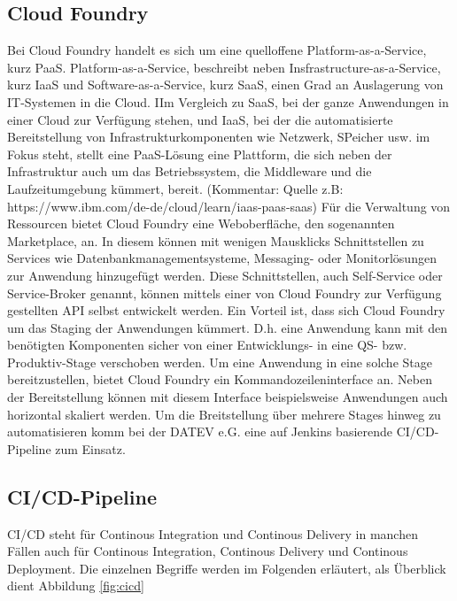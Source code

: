 \subsection{\glqq Cloud Foundry\grqq}
Bei Cloud Foundry handelt es sich um eine quelloffene Platform-as-a-Service, kurz PaaS.
Platform-as-a-Service, beschreibt neben Insfrastructure-as-a-Service, kurz IaaS und Software-as-a-Service, kurz SaaS, einen Grad an Auslagerung von IT-Systemen in die Cloud.
IIm Vergleich zu SaaS, bei der ganze Anwendungen in einer Cloud zur Verfügung stehen, und IaaS, bei der die automatisierte Bereitstellung von Infrastrukturkomponenten wie Netzwerk, SPeicher usw. im Fokus steht, stellt eine PaaS-Lösung eine Plattform, die sich neben der Infrastruktur auch um das Betriebssystem, die Middleware und die Laufzeitumgebung kümmert, bereit. (Kommentar: Quelle z.B: https://www.ibm.com/de-de/cloud/learn/iaas-paas-saas)
Für die Verwaltung von Ressourcen bietet Cloud Foundry eine Weboberfläche, den sogenannten \glqq Marketplace\grqq, an.
In diesem können mit wenigen Mausklicks Schnittstellen zu Services wie Datenbankmanagementsysteme, Messaging- oder Monitorlösungen zur Anwendung hinzugefügt werden.
Diese Schnittstellen, auch \glqq Self-Service\grqq{} oder \glqq Service-Broker\grqq{} genannt, können mittels einer von Cloud Foundry zur Verfügung gestellten API selbst entwickelt werden.
Ein Vorteil ist, dass sich Cloud Foundry um das Staging der Anwendungen kümmert.
D.h. eine Anwendung kann mit den benötigten Komponenten sicher von einer Entwicklungs- in eine QS- bzw. Produktiv-Stage verschoben werden. 
Um eine Anwendung in eine solche Stage bereitzustellen, bietet Cloud Foundry ein Kommandozeileninterface an.
Neben der Bereitstellung können mit diesem Interface beispielsweise Anwendungen auch horizontal skaliert werden.
Um die Breitstellung über mehrere Stages hinweg zu automatisieren komm bei der DATEV e.G. eine auf Jenkins basierende CI/CD-Pipeline zum Einsatz.
\cite{foundry.23.2.2020}

\subsection{\glqq CI/CD-Pipeline\grqq}\label{sec:cicd}
CI/CD steht für \glqq Continous Integration und Continous Delivery\grqq{} in manchen Fällen auch für \glqq Continous Integration, Continous Delivery und Continous Deployment\grqq{}.
Die einzelnen Begriffe werden im Folgenden erläutert, als Überblick dient Abbildung \ref{fig:cicd}


